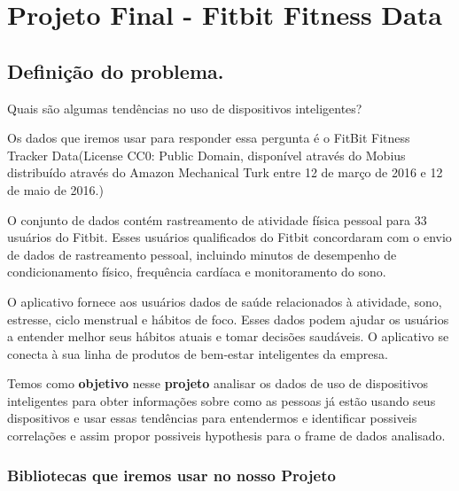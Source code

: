 \chapter{Projeto Final - Fitbit Fitness Data}

\section{Definição do problema.}

Quais são algumas tendências no uso de dispositivos inteligentes?

Os dados que iremos usar para responder essa pergunta é o FitBit Fitness
Tracker Data(License CC0: Public Domain, disponível através do Mobius
distribuído através do Amazon Mechanical Turk entre 12 de março de 2016
e 12 de maio de 2016.)

O conjunto de dados contém rastreamento de atividade física pessoal para
33 usuários do Fitbit. Esses usuários qualificados do Fitbit concordaram
com o envio de dados de rastreamento pessoal, incluindo minutos de
desempenho de condicionamento físico, frequência cardíaca e
monitoramento do sono.

O aplicativo fornece aos usuários dados de saúde relacionados à
atividade, sono, estresse, ciclo menstrual e hábitos de foco. Esses
dados podem ajudar os usuários a entender melhor seus hábitos atuais e
tomar decisões saudáveis. O aplicativo se conecta à sua linha de
produtos de bem-estar inteligentes da empresa.

Temos como \textbf{objetivo} nesse \textbf{projeto} analisar os dados de
uso de dispositivos inteligentes para obter informações sobre como as
pessoas já estão usando seus dispositivos e usar essas tendências para
entendermos e identificar possiveis correlações e assim propor possiveis
hypothesis para o frame de dados analisado.


\subsection{Bibliotecas que iremos usar no nosso Projeto}


